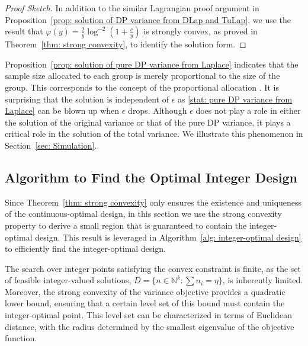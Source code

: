 \documentclass{article}
\theoremstyle{definition}
\newtheorem{remark}[theorem]{Remark}
\begin{document}
\begin{proof}[Proof Sketch]
    In addition to the similar Lagrangian proof argument in Proposition~\ref{prop: solution of DP variance from DLap and TuLap}, we use the result that $\varphi (y) = \frac{2}{y} \log^{-2} \left( 1+ \frac{c}{y} \right)$ is strongly convex, as proved in Theorem~\ref{thm: strong convexity}, to identify the solution form.
\end{proof}

    Proposition~\ref{prop: solution of pure DP variance from Laplace} indicates that the sample size allocated to each group is merely proportional to the size of the group. This corresponds to the concept of the proportional allocation \citep{kempf2004encyclopedia}.  It is surprising that the solution is independent of $\epsilon$ as \eqref{stat: pure DP variance from Laplace} can be blown up when $\epsilon$ drops. Although $\epsilon$ does not play a role in either the solution of the original variance or that of the pure DP variance, it plays a critical role in the solution of the total variance. We illustrate this phenomenon in Section~\ref{sec: Simulation}.

\subsection{Algorithm to Find the Optimal Integer Design} \label{subsec: algorithm}

Since Theorem~\ref{thm: strong convexity} only ensures the existence and uniqueness of the continuous-optimal design, in this section we use the strong convexity property to derive a small region that is guaranteed to contain the integer-optimal design. This result is leveraged in Algorithm~\ref{alg: integer-optimal design} to efficiently find the integer-optimal design.

The search over integer points satisfying the convex constraint is finite, as the set of feasible integer-valued solutions, $D = \{ n \in \mathbb{N}^k : \sum n_i = \eta\}$, is inherently limited. Moreover, the strong convexity of the variance objective provides a quadratic lower bound, ensuring that a certain level set of this bound must contain the integer-optimal point. This level set can be characterized in terms of Euclidean distance, with the radius determined by the smallest eigenvalue of the objective function.
\end{document}
